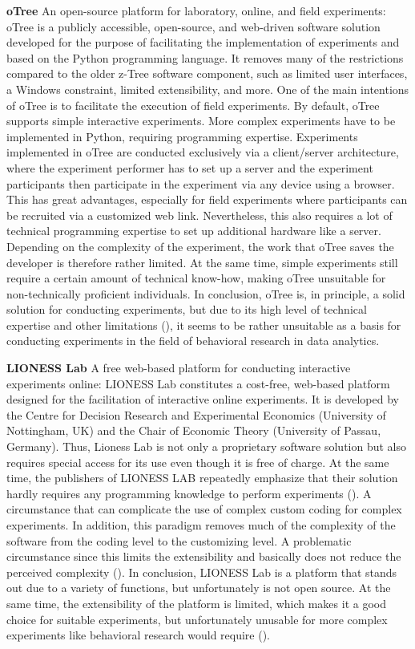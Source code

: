 \textbf{oTree} An open-source platform for laboratory, online, and field experiments:
oTree is a publicly accessible, open-source, and web-driven software solution developed for the purpose of facilitating the implementation of experiments and based on the Python programming language. It removes many of the restrictions compared to the older z-Tree software component, such as limited user interfaces, a Windows constraint, limited extensibility, and more. One of the main intentions of oTree is to facilitate the execution of field experiments. By default, oTree supports simple interactive experiments. More complex experiments have to be implemented in Python, requiring programming expertise. Experiments implemented in oTree are conducted exclusively via a client/server architecture, where the experiment performer has to set up a server and the experiment participants then participate in the experiment via any device using a browser. This has great advantages, especially for field experiments where participants can be recruited via a customized web link. Nevertheless, this also requires a lot of technical programming expertise to set up additional hardware like a server. Depending on the complexity of the experiment, the work that oTree saves the developer is therefore rather limited. At the same time, simple experiments still require a certain amount of technical know-how, making oTree unsuitable for non-technically proficient individuals. In conclusion, oTree is, in principle, a solid solution for conducting experiments, but due to its high level of technical expertise and other limitations (\cite{Chen.2016}), it seems to be rather unsuitable as a basis for conducting experiments in the field of behavioral research in data analytics. 

\textbf{LIONESS Lab} A free web-based platform for conducting interactive experiments online:
LIONESS Lab constitutes a cost-free, web-based platform designed for the facilitation of interactive online experiments. It is developed by the Centre for Decision Research and Experimental Economics (University of Nottingham, UK) and the Chair of Economic Theory (University of Passau, Germany). Thus, Lioness Lab is not only a proprietary software solution but also requires special access for its use even though it is free of charge. At the same time, the publishers of LIONESS LAB repeatedly emphasize that their solution hardly requires any programming knowledge to perform experiments (\cite{Giamattei.2020}). A circumstance that can complicate the use of complex custom coding for complex experiments. In addition, this paradigm removes much of the complexity of the software from the coding level to the customizing level. A problematic circumstance since this limits the extensibility and basically does not reduce the perceived complexity (\cite{Chou.2008}). In conclusion, LIONESS Lab is a platform that stands out due to a variety of functions, but unfortunately is not open source. At the same time, the extensibility of the platform is limited, which makes it a good choice for suitable experiments, but unfortunately unusable for more complex experiments like behavioral research would require (\cite{Giamattei.2020}). 

